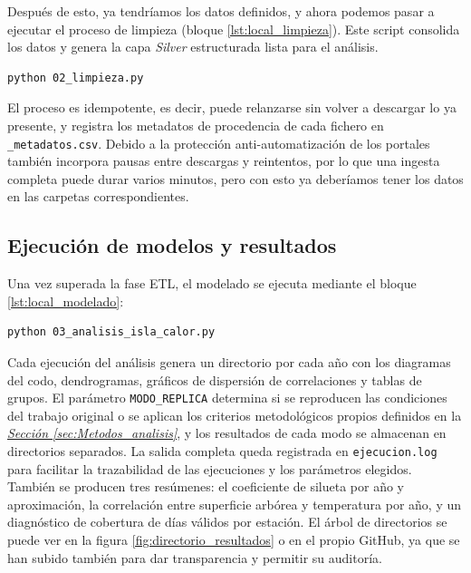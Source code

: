 Después de esto, ya tendríamos los datos definidos, y ahora podemos pasar a ejecutar el proceso de limpieza (bloque \ref*{lst:local_limpieza}). Este script consolida los datos y genera la capa \textit{Silver} estructurada lista para el análisis.

\begin{lstlisting}[language=bash, float=htbp, caption={Ejecución local de limpieza}, label=lst:local_limpieza]
	python 02_limpieza.py
\end{lstlisting}

El proceso es idempotente, es decir, puede relanzarse sin volver a descargar lo ya presente, y registra los metadatos de procedencia de cada fichero en \texttt{\_metadatos.csv}. Debido a la protección anti-automatización de los portales también incorpora pausas entre descargas y reintentos, por lo que una ingesta completa puede durar varios minutos, pero con esto ya deberíamos tener los datos en las carpetas correspondientes.

\subsection{Ejecución de modelos y resultados}
\label{subsec:Manual_Local_Modelos}

Una vez superada la fase ETL, el modelado se ejecuta mediante el bloque \ref*{lst:local_modelado}:

\begin{lstlisting}[language=bash, float=htbp, caption={Ejecución local del modelado analítico}, label=lst:local_modelado]
	python 03_analisis_isla_calor.py
\end{lstlisting}

Cada ejecución del análisis genera un directorio por cada año con los diagramas del codo, dendrogramas, gráficos de dispersión de correlaciones y tablas de grupos. El parámetro \texttt{MODO\_REPLICA} determina si se reproducen las condiciones del trabajo original o se aplican los criterios metodológicos propios definidos en la \hyperref[sec:Metodos_analisis]{\textit{Sección \ref*{sec:Metodos_analisis}}}, y los resultados de cada modo se almacenan en directorios separados. La salida completa queda registrada en \texttt{ejecucion.log} para facilitar la trazabilidad de las ejecuciones y los parámetros elegidos. También se producen tres resúmenes: el coeficiente de silueta por año y aproximación, la correlación entre superficie arbórea y temperatura por año, y un diagnóstico de cobertura de días válidos por estación. El árbol de directorios se puede ver en la figura \ref*{fig:directorio_resultados} o en el propio GitHub, ya que se han subido también para dar transparencia y permitir su auditoría.

